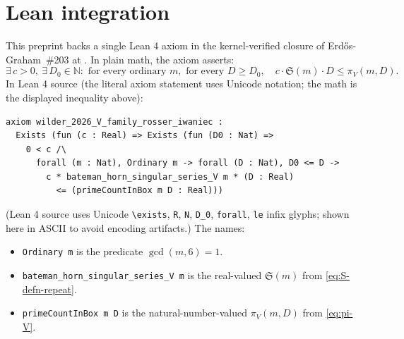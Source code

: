 \documentclass[11pt,a4paper]{article}
\theoremstyle{plain}
\theoremstyle{definition}
\theoremstyle{remark}
\begin{document}










\section{Lean integration}\label{sec:lean}

This preprint backs a single Lean 4 axiom in the kernel-verified
closure of Erd\H{o}s-Graham~\#203 at \cite{WilderEG203Lean2026}. In
plain math, the axiom asserts:
\[
  \exists\, c > 0,\ \exists\, D_{0} \in \mathbb{N} : \text{ for every
  ordinary } m, \text{ for every } D \geq D_{0},
  \quad c \cdot \mathfrak{S}(m) \cdot D \leq \pi_{V}(m, D).
\]
In Lean 4 source (the literal axiom statement uses Unicode
notation; the math is the displayed inequality above):

\begin{verbatim}
axiom wilder_2026_V_family_rosser_iwaniec :
  Exists (fun (c : Real) => Exists (fun (D0 : Nat) =>
    0 < c /\
      forall (m : Nat), Ordinary m -> forall (D : Nat), D0 <= D ->
        c * bateman_horn_singular_series_V m * (D : Real)
          <= (primeCountInBox m D : Real)))
\end{verbatim}

(Lean 4 source uses Unicode \texttt{\textbackslash exists}, \texttt{R},
\texttt{N}, \texttt{D\_0}, \texttt{forall}, \texttt{le} infix glyphs;
shown here in ASCII to avoid encoding artifacts.) The names:
\begin{itemize}
  \item \texttt{Ordinary m} is the predicate $\gcd(m, 6) = 1$.
  \item \texttt{bateman\_horn\_singular\_series\_V m} is the
    real-valued $\mathfrak{S}(m)$ from \cref{eq:S-defn-repeat}.
  \item \texttt{primeCountInBox m D} is the natural-number-valued
    $\pi_{V}(m, D)$ from \cref{eq:pi-V}.
\end{itemize}
\end{document}
